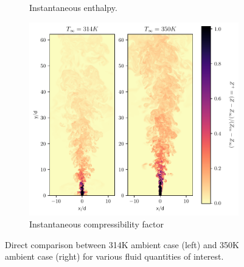 \begin{figure}[H]
\begin{subfigure}{0.5\textwidth}
	\caption{Instantaneous enthalpy.} \label{noniso_Hi_1}
\end{subfigure}
\hfill
\begin{subfigure}{0.5\textwidth}
	\centering
	\includegraphics[scale=.45]{figures/Plots/vertical/Z_scaled_vert_noniso.pdf}
	\caption{Instantaneous compressibility factor} \label{noniso_Z_1}
\end{subfigure}
\caption{Direct comparison between 314K ambient case (left) and 350K ambient case (right) for various fluid quantities of interest.}
\label{noniso_various_features}
\end{figure}

